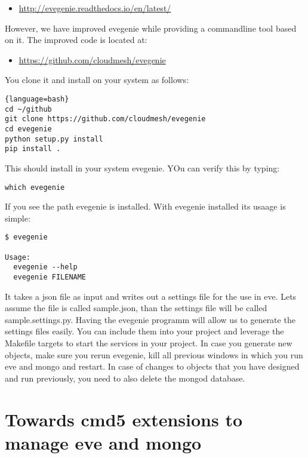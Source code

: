\begin{itemize}
\item
 \url{http://evegenie.readthedocs.io/en/latest/}
\end{itemize}

However, we have improved evegenie while providing a commandline tool
based on it. The improved code is located at:

\begin{itemize}
\tightlist
\item
 \url{https://github.com/cloudmesh/evegenie}
\end{itemize}

You clone it and install on your system as follows:

\begin{lstlisting}{language=bash}
cd ~/github
git clone https://github.com/cloudmesh/evegenie
cd evegenie
python setup.py install
pip install .
\end{lstlisting}

This should install in your system evegenie. YOu can verify this by
typing:

\begin{lstlisting}
which evegenie
\end{lstlisting}

If you see the path evegenie is installed. With evegenie installed its
usaage is simple:

\begin{lstlisting}
$ evegenie

Usage:
  evegenie --help
  evegenie FILENAME
\end{lstlisting}

It takes a json file as input and writes out a settings file for the use
in eve. Lets assume the file is called sample.json, than the settings
file will be called sample.settings.py. Having the evegenie programm
will allow us to generate the settings files easily. You can include
them into your project and leverage the Makefile targets to start the
services in your project. In case you generate new objects, make sure
you rerun evegenie, kill all previous windows in which you run eve and
mongo and restart. In case of changes to objects that you have designed
and run previously, you need to also delete the mongod database.

\section{Towards cmd5 extensions to manage eve and
mongo}\label{towards-cmd5-extensions-to-manage-eve-and-mongo}

